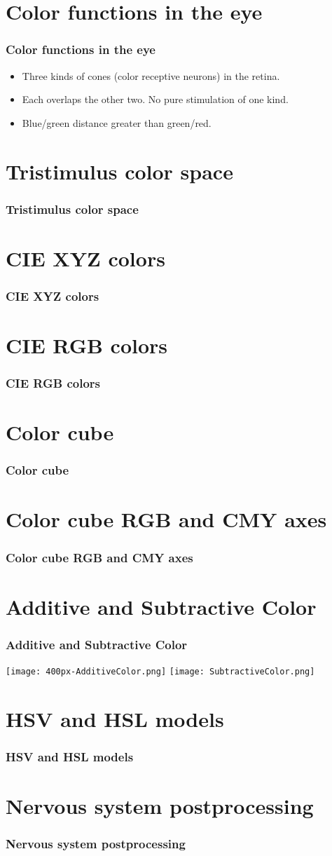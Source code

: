 \documentclass[slidestop]{beamer}
\newcommand{\sect}[1]{
\section{#1}
\begin{frame}[fragile]\frametitle{#1}
}
\begin{document}
\sect{Color functions in the eye}
\begin{itemize}
\item Three kinds of cones (color receptive neurons) in the retina.
\item Each overlaps the other two.  No pure stimulation of one kind.
  \item Blue/green distance greater than green/red.
\end{itemize}
\end{frame}

\sect{Tristimulus color space}
\end{frame}

\sect{CIE XYZ colors}
\end{frame}

\sect{CIE RGB colors}
\end{frame}


\sect{Color cube}
\end{frame}

\sect{Color cube RGB and CMY axes}
\end{frame}

\sect{Additive and Subtractive Color}
\texttt{[image: 400px-AdditiveColor.png]}\hfill
\texttt{[image: SubtractiveColor.png]}
\end{frame}

\sect{HSV and HSL models}
\end{frame}

\sect{Nervous system postprocessing}
\end{frame}
\end{document}
